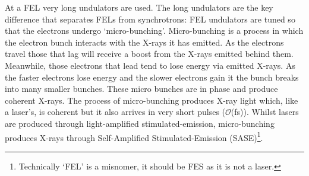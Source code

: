 At a FEL very long undulators are used. The long undulators are the key difference that separates FELs from synchrotrons: FEL undulators are tuned so that the electrons undergo `micro-bunching'. Micro-bunching is a process in which the electron bunch interacts with the X-rays it has emitted. As the electrons travel those that lag will receive a boost from the X-rays emitted behind them. Meanwhile, those electrons that lead tend to lose energy via emitted X-rays. As the faster electrons lose energy and the slower electrons gain it the bunch breaks into many smaller bunches. These micro bunches are in phase and produce coherent X-rays. The process of micro-bunching produces X-ray light which, like a laser's, is coherent but it also arrives in very short pulses (\(\mathcal{O}\)(fs)). Whilst lasers are produced through light-amplified stimulated-emission, micro-bunching produces X-rays through Self-Amplified Stimulated-Emission (SASE)\footnote{Technically `FEL' is a misnomer, it should be FES as it is not a laser.}.


